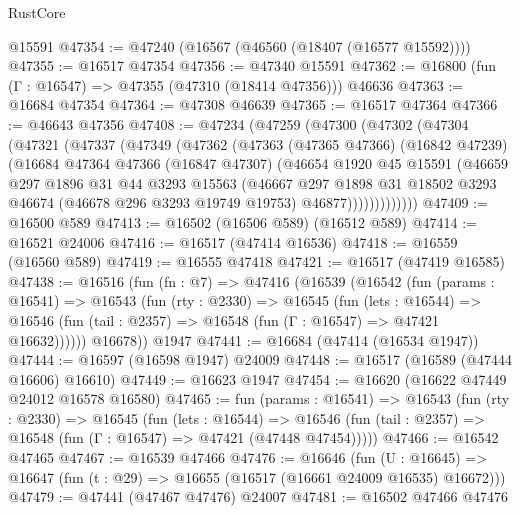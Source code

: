 \begin{lexlean}{RustCore}
\begin{coremodule}
    @15591
@47354 := @47240 (@16567 (@46560 (@18407 (@16577 @15592))))
@47355 := @16517 @47354
@47356 := @47340 @15591
@47362 := @16800 (fun (Γ : @16547) => @47355 (@47310 (@18414 @47356))) @46636
@47363 := @16684 @47354
@47364 := @47308 @46639
@47365 := @16517 @47364
@47366 := @46643 @47356
@47408 := @47234
    (@47259
      (@47300
        (@47302
          (@47304
            (@47321
              (@47337
                (@47349
                  (@47362
                    (@47363
                      (@47365 @47366)
                      (@16842 @47239)
                      (@16684
                        @47364
                        @47366
                        (@16847 @47307)
                        (@46654
                          @1920
                          @45
                          @15591
                          (@46659
                            @297
                            @1896
                            @31
                            @44
                            @3293
                            @15563
                            (@46667
                              @297
                              @1898
                              @31
                              @18502
                              @3293
                              @46674
                              (@46678 @296 @3293 @19749 @19753)
                              @46877)))))))))))))
@47409 := @16500 @589
@47413 := @16502 (@16506 @589) (@16512 @589)
@47414 := @16521 @24006
@47416 := @16517 (@47414 @16536)
@47418 := @16559 (@16560 @589)
@47419 := @16555 @47418
@47421 := @16517 (@47419 @16585)
@47438 := @16516
    (fun (fn : @7) =>
    @47416
      (@16539
        (@16542
          (fun (params : @16541) =>
          @16543
            (fun (rty : @2330) =>
            @16545
              (fun (lets : @16544) =>
              @16546 (fun (tail : @2357) => @16548 (fun (Γ : @16547) => @47421 @16632))))))
        @16678))
    @1947
@47441 := @16684 (@47414 (@16534 @1947))
@47444 := @16597 (@16598 @1947) @24009
@47448 := @16517 (@16589 (@47444 @16606) @16610)
@47449 := @16623 @1947
@47454 := @16620 (@16622 @47449 @24012 @16578 @16580)
@47465 := fun (params : @16541) =>
  @16543
    (fun (rty : @2330) =>
    @16545
      (fun (lets : @16544) =>
      @16546 (fun (tail : @2357) => @16548 (fun (Γ : @16547) => @47421 (@47448 @47454)))))
@47466 := @16542 @47465
@47467 := @16539 @47466
@47476 := @16646
    (fun (U : @16645) => @16647 (fun (t : @29) => @16655 (@16517 (@16661 @24009 @16535) @16672)))
@47479 := @47441 (@47467 @47476) @24007
@47481 := @16502 @47466 @47476

\end{coremodule}
\end{lexlean}
